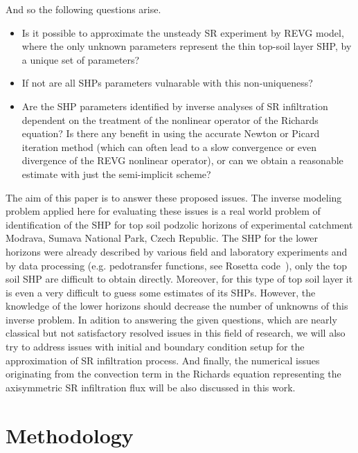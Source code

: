 \documentclass[review]{elsarticle}
\begin{document}
And so the following questions arise. 
\begin{itemize}
\item Is it possible to approximate the unsteady SR experiment by REVG model, where the only unknown parameters represent the thin top-soil layer SHP, by a unique set of parameters? \
\item If not are all SHPs parameters vulnarable with this non-uniqueness?
\item Are the SHP parameters identified by inverse analyses of SR infiltration dependent on the treatment of the nonlinear operator of the Richards equation? Is there any benefit in using the accurate Newton or Picard iteration method (which can often lead to a slow convergence or even divergence of the REVG nonlinear operator), or can we obtain a reasonable estimate with just the semi-implicit scheme?
\end{itemize}



The aim of this paper is to answer these proposed issues. The inverse modeling problem applied here for evaluating these issues is  a real world problem of identification of the SHP  for top soil podzolic horizons of experimental catchment Modrava, Sumava National Park, Czech Republic.  The SHP for the lower horizons were already described by various field and laboratory experiments and by data processing (e.g. pedotransfer functions, see Rosetta code~\citep{Schaap}), only the top soil SHP are difficult to  obtain directly. Moreover, for this type of top soil layer it is even a very difficult to guess some estimates of its SHPs. However, the knowledge of the lower horizons should decrease the number of unknowns of this inverse problem. In adition to answering the given questions, which are nearly classical but not satisfactory resolved issues in this field of research, we will also try to address issues with initial and boundary condition setup for the approximation of SR infiltration process. And finally, the numerical issues originating from the convection term in the Richards equation representing the axisymmetric SR infiltration flux will be also discussed in this work.









\section{Methodology}%
\label{metodo}
\end{document}
